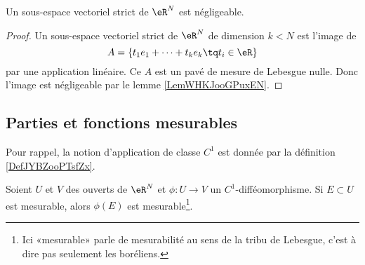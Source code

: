 \begin{corollary}
    Un sous-espace vectoriel strict de \( \eR^N\) est négligeable.
\end{corollary}

\begin{proof}
    Un sous-espace vectoriel strict de \( \eR^N\) de dimension \( k<N\) est l'image de
    \begin{equation}
        A=\{ t_1e_1+\cdots +t_ke_k\tq t_i\in \eR \}
    \end{equation}
    par une application linéaire. Ce \( A\) est un pavé de mesure de Lebesgue nulle. Donc l'image est négligeable par le lemme \ref{LemWHKJooGPuxEN}.
\end{proof}

\subsection{Parties et fonctions mesurables}

Pour rappel, la notion d'application de classe \( C^1\) est donnée par la définition \ref{DefJYBZooPTsfZx}.

\begin{proposition}     \label{PropRDRNooFnZSKt}
    Soient \( U\) et \( V\) des ouverts de \( \eR^N\) et \( \phi\colon U\to V\) un \( C^1\)-difféomorphisme. Si \( E\subset U\) est mesurable, alors \( \phi(E)\) est mesurable\footnote{Ici «mesurable» parle de mesurabilité au sens de la tribu de Lebesgue, c'est à dire pas seulement les boréliens.}.
\end{proposition}

